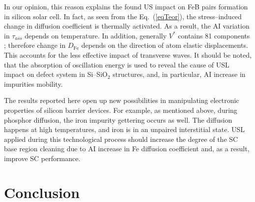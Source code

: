 \documentclass[sn-mathphys]{sn-jnl}%
\theoremstyle{thmstyleone}%
\theoremstyle{thmstyletwo}%
\theoremstyle{thmstylethree}%
\begin{document}
In our opinion, this reason explains the found US impact on FeB pairs formation in silicon solar cell.
In fact, as seen from the Eq.~(\ref{eqTeor}), the stress--induced change in diffusion coefficient is
thermally  activated.
As a result, the AI variation in $\tau_{ass}$ depends on temperature.
In addition, generally $V^*$ contains 81 components \cite{AZIZ2001};
therefore change in $D_\mathrm{Fe}$ depends on the direction of atom elastic displacements.
This accounts for the less effective impact of transverse waves.
It should be noted, that the absorption of oscillation energy is used \cite{GORB2020,UST:Medvid}
to reveal the cause of USL impact on defect system in Si--SiO$_2$ structures,
and, in particular, AI increase in impurities mobility.

The results reported here open up new possibilities in manipulating
electronic properties of silicon barrier devices.
For example, as mentioned above, during phosphor diffusion,
the iron impurity gettering occurs as well.
The diffusion happens at high temperatures, and iron is in an unpaired interstitial state.
USL applied during this technological process should increase
the degree of the SC base region cleaning due to AI increase
in Fe diffusion coefficient and, as a result, improve SC performance.

\section{Conclusion}

\end{document}
